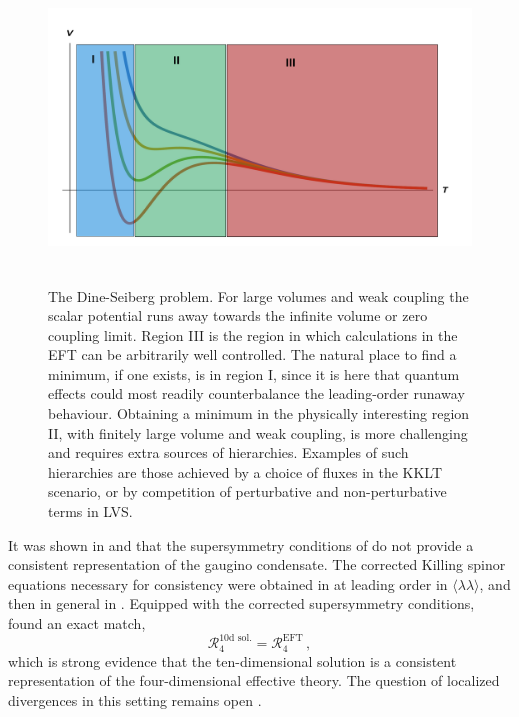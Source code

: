 \documentclass[12pt,a4wide]{article}
\begin{document}
\begin{figure}[t]
\begin{center}
\includegraphics[width=140mm,height=82mm]{Images/DineSeiberg_3.pdf}  
\caption{The Dine-Seiberg problem. For large volumes and weak coupling the scalar potential runs away towards the infinite volume or zero coupling limit. Region III is the region in which calculations in the EFT can be arbitrarily well controlled. The natural place to find a minimum, if one exists, is in region I, since it is here that quantum effects could most readily counterbalance the leading-order runaway behaviour. Obtaining a minimum in the physically interesting region II, with finitely large volume and weak coupling, is more challenging and requires extra sources of hierarchies.  Examples of such hierarchies are those achieved by a choice of fluxes in the KKLT scenario, or by competition of perturbative and non-perturbative terms in LVS. } \label{Fig:DS} 
\end{center}
\end{figure}
It was shown in \cite{Kachru:2019dvo} and \cite{Grana:2022nyp} that the supersymmetry conditions of \cite{Koerber:2007xk} do not provide a consistent representation of the gaugino condensate.  The corrected Killing spinor equations necessary for consistency were obtained in \cite{Kachru:2019dvo} at leading order in $\langle \lambda\lambda\rangle$, and then in general in \cite{Grana:2022nyp}.
Equipped with the corrected supersymmetry conditions, \cite{Kachru:2019dvo} found an exact match,
\begin{equation}
\mathcal{R}_4^{\text{10d sol.}}=\mathcal{R}_4^{\text{EFT}}\,,
\end{equation}
which is strong evidence that the ten-dimensional solution is a consistent representation of the four-dimensional effective theory.  The question of localized divergences in this setting remains open 
\cite{Hamada:2021ryq,Grana:2022nyp}.
\end{document}
